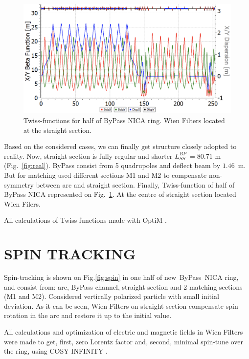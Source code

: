 \documentclass[a4paper]{jpconf}
\begin{document}
\begin{figure}[!h]
   \centering
   \includegraphics*[width=1.\columnwidth]{fig7}
   \caption{Twiss-functions for half of ByPass NICA ring. Wien Filters located at the straight section.}
   \label{fig:realTwiss}
\end{figure}

 \par Based on the considered cases, we can finally get structure closely adopted to reality. Now, straight section is fully regular and shorter $L^{BP}_{SS}~=80.71$ m (Fig.~\ref{fig:real}). ByPass consist from 5 quadrupoles and deflect beam by $1.46$~m. But for matching used different sections M1 and M2 to compensate non-symmetry between arc and straight section. Finally, Twiss-function of half of ByPass NICA represented on Fig.~\ref{fig:realTwiss}. At the centre of straight section located Wien Filers.
 \par All calculations of Twiss-functions made with OptiM \cite{OptiM}.

\section{SPIN TRACKING}

\par Spin-tracking is shown on Fig.\ref{fig:spin} in one half of new~ByPass~NICA ring, and consist from: arc, ByPass channel, straight section and 2 matching sections (M1 and M2). Considered vertically polarized particle with small initial deviation. As it can be seen, Wien Filters on straight section compensate spin rotation in the arc and restore it up to the initial value.
\par All calculations and optimization of electric and magnetic fields in Wien Filters were made to get, first, zero Lorentz factor and, second, minimal spin-tune over the ring, using COSY INFINITY \cite{COSY}.
\end{document}
